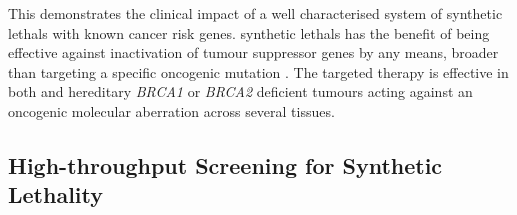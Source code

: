 This demonstrates the clinical impact of a well characterised system of \glspl{synthetic lethal} with known cancer risk genes. \Glspl{synthetic lethal} has the benefit of being effective against inactivation of \gls{tumour suppressor} genes by any means, broader than targeting a specific oncogenic \gls{mutation} \citep{Kaelin2005}. The \gls{targeted therapy} is effective in both  and \gls{hereditary} \textit{BRCA1} or \textit{BRCA2} deficient \glspl{tumour} acting against an oncogenic molecular aberration across several tissues.  

\subsection[High{}-throughput Screening for Synthetic Lethality]{High-throughput Screening for Synthetic Lethality}



